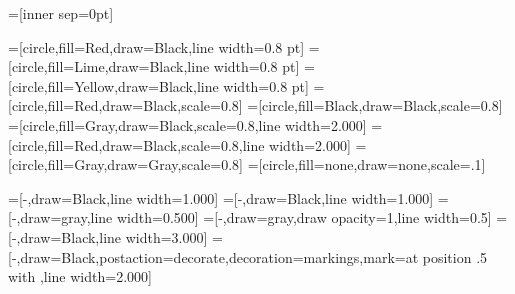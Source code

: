 
\usepackage[svgnames]{xcolor}
\usepackage{tikz}
\usetikzlibrary{decorations.markings}
\usetikzlibrary{shapes.geometric}


=[inner sep=0pt]

=[circle,fill=Red,draw=Black,line width=0.8 pt]
=[circle,fill=Lime,draw=Black,line width=0.8 pt]
=[circle,fill=Yellow,draw=Black,line width=0.8 pt]
=[circle,fill=Red,draw=Black,scale=0.8]
=[circle,fill=Black,draw=Black,scale=0.8]
=[circle,fill=Gray,draw=Black,scale=0.8,line width=2.000]
=[circle,fill=Red,draw=Black,scale=0.8,line width=2.000]
=[circle,fill=Gray,draw=Gray,scale=0.8]
=[circle,fill=none,draw=none,scale=.1]




=[-,draw=Black,line width=1.000]
=[-,draw=Black,line width=1.000]
=[-,draw=gray,line width=0.500]
=[-,draw=gray,draw opacity=1,line width=0.5]
=[-,draw=Black,line width=3.000]
=[-,draw=Black,postaction={decorate},decoration={markings,mark=at position .5 with {\arrow{>}}},line width=2.000]


